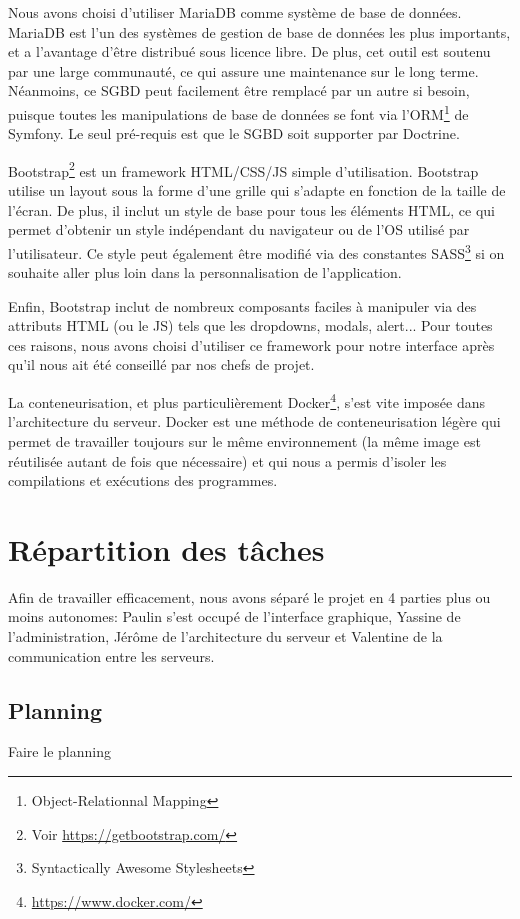 \par Nous avons choisi d'utiliser MariaDB comme système de base de données. MariaDB est l'un des systèmes de gestion de base de données les plus importants, et a l'avantage d'être distribué sous licence libre. De plus, cet outil est soutenu par une large communauté, ce qui assure une maintenance sur le long terme. Néanmoins, ce SGBD peut facilement être remplacé par un autre si besoin, puisque toutes les manipulations de base de données se font via l'ORM\footnote{Object-Relationnal Mapping} de Symfony. Le seul pré-requis est que le SGBD soit supporter par Doctrine.

\par Bootstrap\footnote{Voir \url{https://getbootstrap.com/}} est un framework HTML/CSS/JS simple d'utilisation. Bootstrap utilise un layout sous la forme d'une grille qui s'adapte en fonction de la taille de l'écran. De plus, il inclut un style de base pour tous les éléments HTML, ce qui permet d'obtenir un style indépendant du navigateur ou de l'OS utilisé par l'utilisateur. Ce style peut également être modifié via des constantes SASS\footnote{Syntactically Awesome Stylesheets} si on souhaite aller plus loin dans la personnalisation de l'application. 
\par Enfin, Bootstrap inclut de nombreux composants faciles à manipuler via des attributs HTML (ou le JS) tels que les dropdowns, modals, alert... Pour toutes ces raisons, nous avons choisi d'utiliser ce framework pour notre interface après qu'il nous ait été conseillé par nos chefs de projet.

\par La conteneurisation, et plus particulièrement Docker\footnote{\url{https://www.docker.com/}}, s'est vite imposée dans l'architecture du serveur. Docker est une méthode de conteneurisation légère qui permet de travailler toujours sur le même environnement (la même image est réutilisée autant de fois que nécessaire) et qui nous a permis d'isoler les compilations et exécutions des programmes.

\section{Répartition des tâches}

\par Afin de travailler efficacement, nous avons séparé le projet en 4 parties plus ou moins autonomes: Paulin s'est occupé de l'interface graphique, Yassine de l'administration, Jérôme de l'architecture du serveur et Valentine de la communication entre les serveurs.

\subsection{Planning}

Faire le planning
